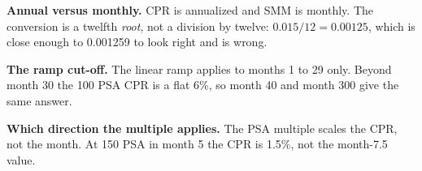 \begin{crtrapbox}
\textbf{Annual versus monthly.} CPR is annualized and SMM is monthly. The
conversion is a twelfth \emph{root}, not a division by twelve: $0.015/12 =
0.00125$, which is close enough to 0.001259 to look right and is wrong.

\smallskip
\textbf{The ramp cut-off.} The linear ramp applies to months 1 to 29 only. Beyond
month 30 the 100 PSA CPR is a flat 6\%, so month 40 and month 300 give the same
answer.

\smallskip
\textbf{Which direction the multiple applies.} The PSA multiple scales the CPR,
not the month. At 150 PSA in month 5 the CPR is 1.5\%, not the month-7.5 value.
\end{crtrapbox}
